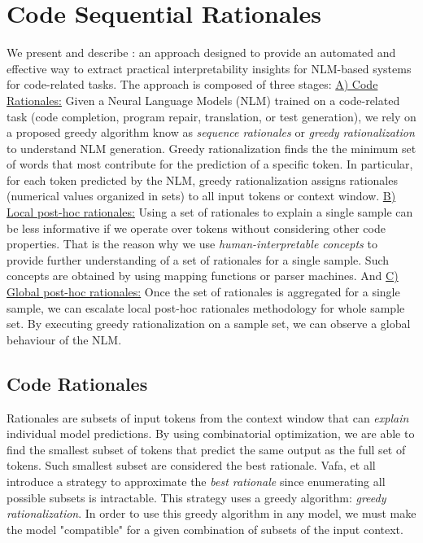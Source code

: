 \section{Code Sequential Rationales}

We present and describe \codeSeqRational: an approach designed to provide an automated and effective way to extract practical interpretability insights for NLM-based systems for code-related tasks. The approach \codeSeqRational is composed of three stages: \underline{A) Code Rationales:} Given a Neural Language Models (NLM) trained on a code-related task (\ie code completion, program repair, translation, or test generation), we rely on a proposed greedy algorithm know as \textit{sequence rationales} or \textit{greedy rationalization} \citep{vafa2021rationales} to understand NLM generation. Greedy rationalization finds the the minimum set of words that most contribute for the prediction of a specific token. In particular, for each token predicted by the NLM, greedy rationalization assigns rationales (numerical values organized in sets) to all input tokens or context window. \underline{B) Local post-hoc rationales:} Using a set of rationales to explain a single sample can be less informative if we operate over tokens without considering other code properties. That is the reason why we use \textit{human-interpretable concepts} to provide further understanding of a set of rationales for a single sample. Such concepts are obtained by using mapping functions or parser machines. And \underline{C) Global post-hoc rationales:} Once the set of rationales is aggregated for a single sample, we can escalate local post-hoc rationales methodology for whole sample set. By executing greedy rationalization on a sample set, we can observe a global behaviour of the NLM. 


\subsection{Code Rationales}
Rationales are subsets of input tokens from the context window that can \textit{explain} individual model predictions. By using combinatorial optimization, we are able to find the smallest subset of tokens that predict the same output as the full set of tokens. Such smallest subset are considered the best rationale. Vafa, et all introduce a strategy to approximate the \textit{best rationale} since enumerating all possible subsets is intractable. This strategy uses a greedy algorithm: \textit{greedy rationalization}. In order to use this greedy algorithm in any model, we must make the model "compatible" for a given combination of subsets of the input context. 

